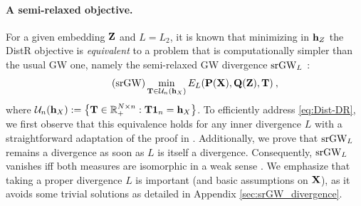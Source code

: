 \paragraph{A semi-relaxed objective.} For a given embedding ${\mathbf{Z}}$ and $L=L_2$, it is known that minimizing in ${\mathbf{h}}_{Z}$ the DistR objective is \emph{equivalent} to a problem that is computationally simpler than the usual GW one, namely the semi-relaxed GW divergence $\operatorname{srGW}_L$ \citep{vincent2021semi}:
\begin{equation*}\tag{srGW} \label{eq:srGW}
	\min_{{\mathbf{T}} \in {\mathcal{U}}_n({\mathbf{h}}_X)} E_L({\mathbf{P}}({\mathbf{X}}), {\mathbf{Q}}({\mathbf{Z}}), {\mathbf{T}}) \:,
\end{equation*}
where ${\mathcal{U}}_n({\mathbf{h}}_X) := \left\{ {\mathbf{T}} \in \mathbb{R}_{+}^{N \times n}: {\mathbf{T}} \bm{1}_n = {\mathbf{h}}_X\right\}$. To efficiently address \cref{eq:Dist-DR}, we first observe that this equivalence holds for any inner divergence $L$ with a straightforward adaptation of the proof in \citet{vincent2021semi}. 
Additionally, we prove that $\operatorname{srGW}_L$ remains a divergence as soon as $L$ is itself a divergence. Consequently, $\operatorname{srGW}_L$ vanishes iff both measures are isomorphic in a weak sense \citep{chowdhury2019gromov}. We emphasize that taking a proper divergence $L$ is important (and basic assumptions on ${\mathbf{X}}$), as it avoids some trivial solutions as detailed in Appendix \ref{sec:srGW_divergence}.





